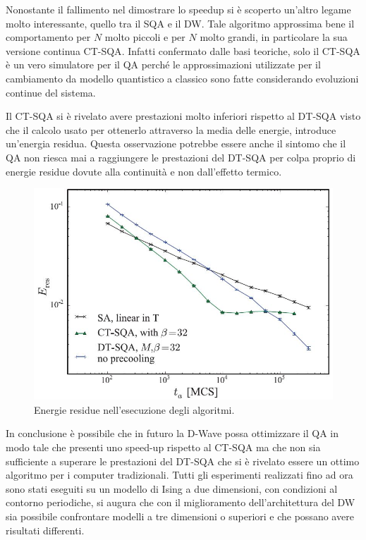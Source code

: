 Nonostante il fallimento nel dimostrare lo speedup si è scoperto un'altro legame molto interessante, quello tra il SQA e il DW. Tale algoritmo approssima bene il comportamento per $N$ molto piccoli e per $N$ molto grandi\cite{EQA}, in particolare la sua versione continua CT-SQA\cite{QVC}. Infatti confermato dalle basi teoriche, solo il CT-SQA è un vero simulatore per il QA perché le approssimazioni utilizzate per il cambiamento da modello quantistico a classico sono fatte considerando evoluzioni continue del sistema.

Il CT-SQA si è rivelato avere prestazioni molto inferiori rispetto al DT-SQA visto che il calcolo usato per ottenerlo attraverso la media delle energie, introduce un'energia residua. Questa osservazione potrebbe essere anche il sintomo che il QA non riesca mai a raggiungere le prestazioni del DT-SQA per colpa proprio di energie residue dovute alla continuità e non dall'effetto termico.

\begin{figure}[htbp]
  \centering
  \includegraphics[scale=0.6]{Immagini/residua.jpg}
  \caption{Energie residue nell'esecuzione degli algoritmi.}
  \label{figura:residua}
\end{figure}

In conclusione è possibile che in futuro la D-Wave possa ottimizzare il QA in modo tale che presenti uno speed-up rispetto al CT-SQA ma che non sia sufficiente a superare le prestazioni del DT-SQA che si è rivelato essere un ottimo algoritmo per i computer tradizionali. Tutti gli esperimenti realizzati fino ad ora sono stati eseguiti su un modello di Ising a due dimensioni, con condizioni al contorno periodiche, si augura che con il miglioramento dell'architettura del DW sia possibile confrontare modelli a tre dimensioni o superiori e che possano avere risultati differenti.
